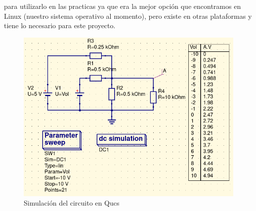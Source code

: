 \documentclass{article}
\begin{document}
para utilizarlo en las practicas ya que era la mejor opción que encontramos en Linux
(nuestro sistema operativo al momento), pero existe en otras plataformas y tiene lo
necesario para este proyecto.\\
\begin{figure}[h]
\centering
\includegraphics[scale=0.3]{CirSim.png}
\caption{Simulación del circuito en Qucs}
\label{Fig:Cir}
\end{figure}
\end{document}
